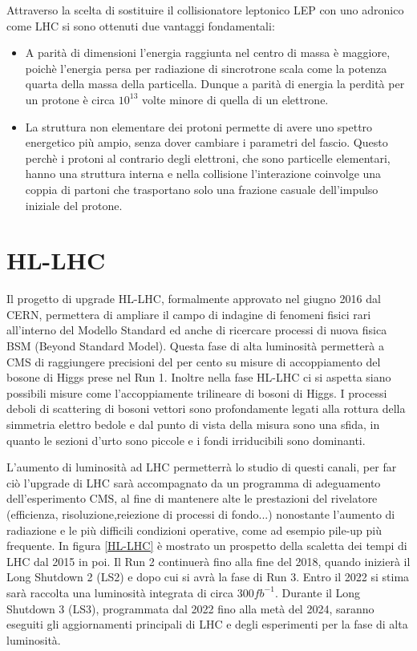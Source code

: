 Attraverso la scelta di sostituire il collisionatore leptonico LEP con uno adronico
come LHC si sono ottenuti due vantaggi fondamentali: 
\begin{itemize}
\item A parità di dimensioni l'energia raggiunta nel centro di massa è maggiore, poichè l'energia persa per radiazione di sincrotrone scala come la potenza quarta della massa della particella. Dunque a parità di energia la perdità per un protone è circa $10^{13}$ volte minore di quella di un elettrone.

\item La struttura non elementare dei protoni permette di avere uno spettro energetico più ampio, senza dover cambiare i parametri del fascio. Questo perchè i protoni al contrario degli elettroni, che sono particelle elementari, hanno una struttura interna e nella collisione l'interazione coinvolge una coppia di partoni che trasportano solo una frazione  casuale dell'impulso iniziale del protone.
\end{itemize}

\section{HL-LHC}
Il progetto di upgrade HL-LHC, formalmente approvato nel giugno 2016 dal CERN, permettera di ampliare il campo di indagine di fenomeni fisici rari all'interno del Modello Standard ed anche di ricercare processi di nuova fisica BSM (Beyond Standard Model). Questa fase di alta luminosità permetterà a CMS di raggiungere precisioni del per cento su misure di accoppiamento del bosone di Higgs prese nel Run 1. Inoltre nella fase HL-LHC ci si aspetta siano possibili misure come l'accoppiamente trilineare di bosoni di Higgs. 
I processi deboli di scattering di bosoni vettori sono profondamente legati alla rottura della simmetria elettro bedole e dal punto di vista della misura sono una sfida, in quanto le sezioni d'urto sono piccole e i fondi irriducibili sono dominanti. 

L'aumento di luminosità ad LHC permetterrà lo studio di questi canali, per far ciò  l'upgrade di LHC sarà accompagnato da un programma di adeguamento dell'esperimento CMS, al fine di mantenere alte le prestazioni del rivelatore (efficienza, risoluzione,reiezione di processi di fondo...) nonostante l'aumento di radiazione e le più difficili condizioni operative, come ad esempio pile-up più frequente.
In figura \ref{HL-LHC} è mostrato un prospetto della scaletta dei tempi di LHC dal 2015 in poi. Il Run 2 continuerà fino alla fine del 2018, quando inizierà il Long Shutdown 2 (LS2) e dopo cui si avrà la fase di Run 3.  Entro il 2022 si stima sarà raccolta una luminosità integrata di circa $300 fb^{-1}$. 
Durante il Long Shutdown 3 (LS3), programmata dal 2022 fino alla metà del 2024, saranno eseguiti gli aggiornamenti principali di LHC e degli esperimenti per la fase di alta luminosità.

